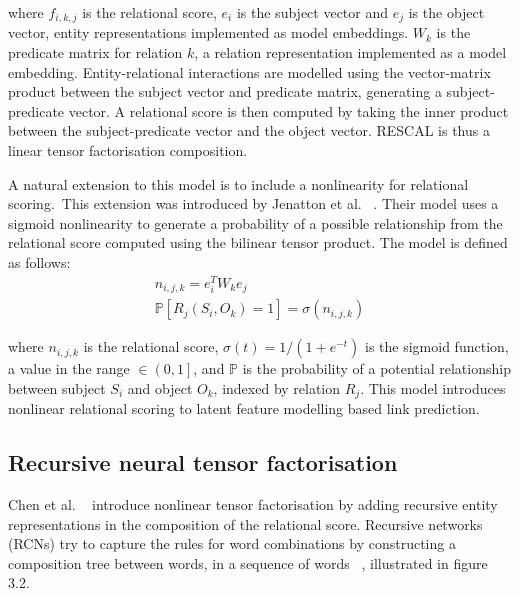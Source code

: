 \noindent where $ f_{i,k,j} $ is the relational score, $ e_i $ is the subject vector and $ e_j $ is the object vector, entity representations implemented as model embeddings. $ W_k $ is the predicate matrix for relation $ k $, a relation representation implemented as a model embedding. Entity-relational interactions are modelled using the vector-matrix product between the subject vector and predicate matrix, generating a subject-predicate vector. A relational score is then computed by taking the inner product between the subject-predicate vector and the object vector. RESCAL is thus a linear tensor factorisation composition. \par

\noindent A natural extension to this model is to include a nonlinearity for relational scoring.\ This extension was introduced by Jenatton et al. \unskip ~\citep{jenatton2012latent}. Their model uses a sigmoid nonlinearity to generate a probability of a possible relationship from the relational score computed using the bilinear tensor product. The model is defined as follows:
\begin{subequations}
	\begin{gather}
		n_{i,j,k} = e_i^TW_ke_j \\
		\mathbb{P}\left [ R_j(S_i, O_k) = 1 \right ] = \sigma(n_{i,j,k})
	\end{gather}
\end{subequations}

\noindent where $ n_{i,j,k} $ is the relational score, $ \sigma(t) = 1/(1 + e^{-t}) $ is the sigmoid function, a value in the range $\in \left ( 0, 1 \right ]$, and $\mathbb{P}$ is the probability of a potential relationship between subject $ S_i $ and object $ O_k $, indexed by relation $ R_j $. This model introduces nonlinear relational scoring to latent feature modelling based link prediction. 



\subsection{Recursive neural tensor factorisation}

Chen et al.  \unskip ~\citep{socher2013reasoning} introduce nonlinear tensor factorisation by adding recursive entity representations in the composition of the relational score. Recursive networks (RCNs) try to capture the rules for word combinations by constructing a composition tree between words, in a sequence of words \unskip ~\citep{socher2012semantic}, illustrated in figure 3.2. \par

